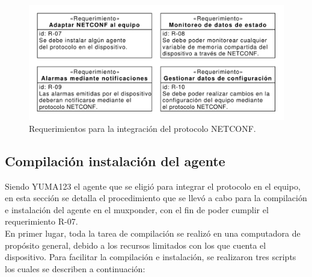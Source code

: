   \begin{figure}[H]
    \centering
    \includegraphics[scale=0.65]{Figures/req_netconf.pdf}
    \caption{Requerimientos para la integración del protocolo NETCONF.}
    \label{fig:req_netconf}
  \end{figure}


  \subsection{Compilación instalación del agente}
Siendo YUMA123 el agente que se eligió para integrar el protocolo en el equipo, en esta sección se detalla el procedimiento que se llevó a cabo para la compilación e instalación del agente en el muxponder, con el fin de poder cumplir el requerimiento R-07.
\\

  En primer lugar, toda la tarea de compilación se realizó en una computadora de propósito general, debido a los recursos limitados con los que cuenta el dispositivo. Para facilitar la compilación e instalación, se realizaron tres scripts los cuales se describen a continuación:

